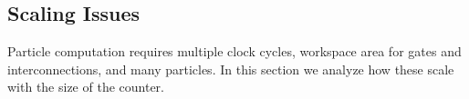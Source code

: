 \documentclass[letterpaper, 10 pt, conference]{ieeeconf}
\begin{document}


\subsection{Scaling Issues}\setcounter{paragraph}{0}
 Particle computation requires multiple clock cycles, workspace area for gates and interconnections, and many particles.  In this section we analyze how these scale with the size of the counter.%

\end{document}
